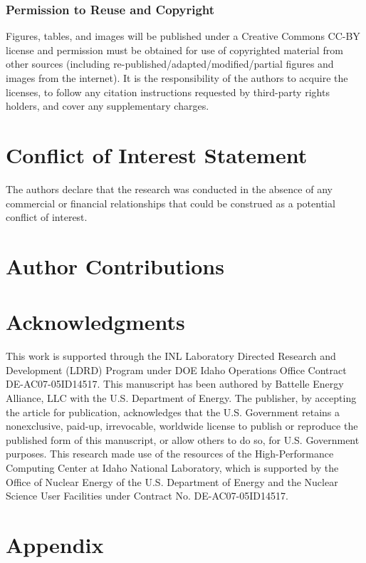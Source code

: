 \documentclass[utf8]{frontiersSCNS} %
\begin{document}
\subsubsection{Permission to Reuse and Copyright}
Figures, tables, and images will be published under a Creative Commons CC-BY license and permission must be obtained for use of copyrighted material from other sources (including re-published/adapted/modified/partial figures and images from the internet). It is the responsibility of the authors to acquire the licenses, to follow any citation instructions requested by third-party rights holders, and cover any supplementary charges.

\section*{Conflict of Interest Statement}

The authors declare that the research was conducted in the absence of any commercial or financial relationships that could be construed as a potential conflict of interest.

\section*{Author Contributions}


\section*{Acknowledgments}
This work is supported through the INL Laboratory Directed Research and Development (LDRD) Program under DOE Idaho Operations Office Contract DE-AC07-05ID14517. This manuscript has been authored by Battelle Energy Alliance, LLC with the U.S. Department of Energy. The publisher, by accepting the article for publication, acknowledges that the U.S. Government retains a nonexclusive, paid-up, irrevocable, worldwide license to publish or reproduce the published form of this manuscript, or allow others to do so, for U.S. Government purposes. This research made use of the resources of the High-Performance Computing Center at Idaho National Laboratory, which is supported by the Office of Nuclear Energy of the U.S. Department of Energy and the Nuclear Science User Facilities under Contract No. DE-AC07-05ID14517. 

\section{Appendix}
\end{document}
